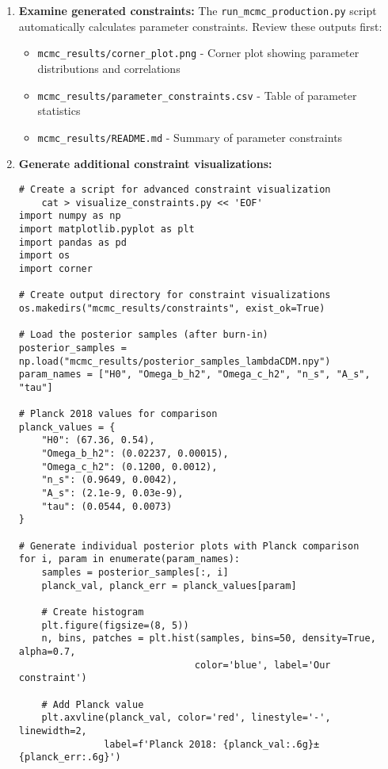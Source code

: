 \documentclass[11pt]{article}
\begin{document}
\begin{enumerate}
    \item \textbf{Examine generated constraints:} The \texttt{run\_mcmc\_production.py} script automatically calculates parameter constraints. Review these outputs first:
    \begin{itemize}
        \item \texttt{mcmc\_results/corner\_plot.png} - Corner plot showing parameter distributions and correlations
        \item \texttt{mcmc\_results/parameter\_constraints.csv} - Table of parameter statistics
        \item \texttt{mcmc\_results/README.md} - Summary of parameter constraints
    \end{itemize}
    
    \item \textbf{Generate additional constraint visualizations:}
    \begin{lstlisting}[basicstyle=\small\ttfamily]
    # Create a script for advanced constraint visualization
    cat > visualize_constraints.py << 'EOF'
import numpy as np
import matplotlib.pyplot as plt
import pandas as pd
import os
import corner

# Create output directory for constraint visualizations
os.makedirs("mcmc_results/constraints", exist_ok=True)

# Load the posterior samples (after burn-in)
posterior_samples = np.load("mcmc_results/posterior_samples_lambdaCDM.npy")
param_names = ["H0", "Omega_b_h2", "Omega_c_h2", "n_s", "A_s", "tau"]

# Planck 2018 values for comparison
planck_values = {
    "H0": (67.36, 0.54),
    "Omega_b_h2": (0.02237, 0.00015),
    "Omega_c_h2": (0.1200, 0.0012),
    "n_s": (0.9649, 0.0042),
    "A_s": (2.1e-9, 0.03e-9),
    "tau": (0.0544, 0.0073)
}

# Generate individual posterior plots with Planck comparison
for i, param in enumerate(param_names):
    samples = posterior_samples[:, i]
    planck_val, planck_err = planck_values[param]
    
    # Create histogram
    plt.figure(figsize=(8, 5))
    n, bins, patches = plt.hist(samples, bins=50, density=True, alpha=0.7, 
                               color='blue', label='Our constraint')
    
    # Add Planck value
    plt.axvline(planck_val, color='red', linestyle='-', linewidth=2, 
               label=f'Planck 2018: {planck_val:.6g}±{planck_err:.6g}')
    

\end{lstlisting}
\end{enumerate}
\end{document}
